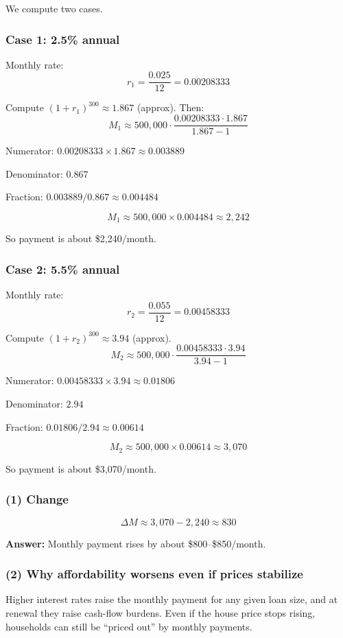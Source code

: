 \documentclass[11pt]{article}
\begin{document}
We compute two cases.

\subsubsection*{Case 1: 2.5\% annual}

Monthly rate:
\[
r_1=\frac{0.025}{12}=0.00208333
\]

Compute \((1+r_1)^{300}\approx 1.867\) (approx). Then:
\[
M_1 \approx 500{,}000 \cdot \frac{0.00208333 \cdot 1.867}{1.867-1}
\]

Numerator: \(0.00208333\times 1.867 \approx 0.003889\)

Denominator: \(0.867\)

Fraction: \(0.003889/0.867 \approx 0.004484\)

\[
M_1 \approx 500{,}000 \times 0.004484 \approx 2{,}242
\]

So payment is about \$2,240/month.

\subsubsection*{Case 2: 5.5\% annual}

Monthly rate:
\[
r_2=\frac{0.055}{12}=0.00458333
\]

Compute \((1+r_2)^{300}\approx 3.94\) (approx).
\[
M_2 \approx 500{,}000 \cdot \frac{0.00458333 \cdot 3.94}{3.94-1}
\]

Numerator: \(0.00458333\times 3.94\approx 0.01806\)

Denominator: \(2.94\)

Fraction: \(0.01806/2.94\approx 0.00614\)

\[
M_2 \approx 500{,}000\times 0.00614 \approx 3{,}070
\]

So payment is about \$3,070/month.

\subsubsection*{(1) Change}

\[
\Delta M \approx 3{,}070-2{,}240 \approx 830
\]

\textbf{Answer:} Monthly payment rises by about \$800–\$850/month.

\subsubsection*{(2) Why affordability worsens even if prices stabilize}

Higher interest rates raise the monthly payment for any given loan size, and at renewal they raise cash-flow burdens. Even if the house price stops rising, households can still be “priced out” by monthly payments.
\end{document}
